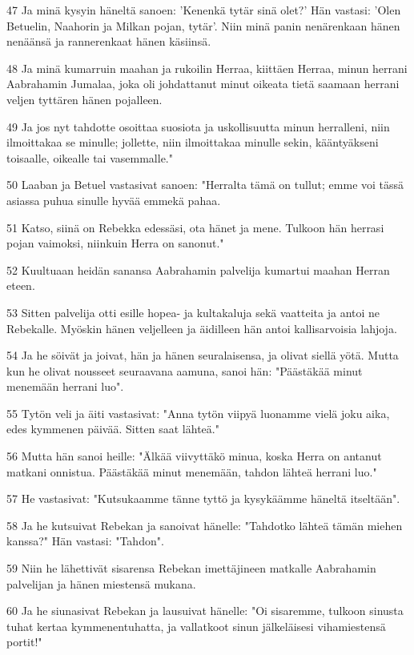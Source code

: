 \par 47 Ja minä kysyin häneltä sanoen: 'Kenenkä tytär sinä olet?' Hän vastasi: 'Olen Betuelin, Naahorin ja Milkan pojan, tytär'. Niin minä panin nenärenkaan hänen nenäänsä ja rannerenkaat hänen käsiinsä.
\par 48 Ja minä kumarruin maahan ja rukoilin Herraa, kiittäen Herraa, minun herrani Aabrahamin Jumalaa, joka oli johdattanut minut oikeata tietä saamaan herrani veljen tyttären hänen pojalleen.
\par 49 Ja jos nyt tahdotte osoittaa suosiota ja uskollisuutta minun herralleni, niin ilmoittakaa se minulle; jollette, niin ilmoittakaa minulle sekin, kääntyäkseni toisaalle, oikealle tai vasemmalle."
\par 50 Laaban ja Betuel vastasivat sanoen: "Herralta tämä on tullut; emme voi tässä asiassa puhua sinulle hyvää emmekä pahaa.
\par 51 Katso, siinä on Rebekka edessäsi, ota hänet ja mene. Tulkoon hän herrasi pojan vaimoksi, niinkuin Herra on sanonut."
\par 52 Kuultuaan heidän sanansa Aabrahamin palvelija kumartui maahan Herran eteen.
\par 53 Sitten palvelija otti esille hopea- ja kultakaluja sekä vaatteita ja antoi ne Rebekalle. Myöskin hänen veljelleen ja äidilleen hän antoi kallisarvoisia lahjoja.
\par 54 Ja he söivät ja joivat, hän ja hänen seuralaisensa, ja olivat siellä yötä. Mutta kun he olivat nousseet seuraavana aamuna, sanoi hän: "Päästäkää minut menemään herrani luo".
\par 55 Tytön veli ja äiti vastasivat: "Anna tytön viipyä luonamme vielä joku aika, edes kymmenen päivää. Sitten saat lähteä."
\par 56 Mutta hän sanoi heille: "Älkää viivyttäkö minua, koska Herra on antanut matkani onnistua. Päästäkää minut menemään, tahdon lähteä herrani luo."
\par 57 He vastasivat: "Kutsukaamme tänne tyttö ja kysykäämme häneltä itseltään".
\par 58 Ja he kutsuivat Rebekan ja sanoivat hänelle: "Tahdotko lähteä tämän miehen kanssa?" Hän vastasi: "Tahdon".
\par 59 Niin he lähettivät sisarensa Rebekan imettäjineen matkalle Aabrahamin palvelijan ja hänen miestensä mukana.
\par 60 Ja he siunasivat Rebekan ja lausuivat hänelle: "Oi sisaremme, tulkoon sinusta tuhat kertaa kymmenentuhatta, ja vallatkoot sinun jälkeläisesi vihamiestensä portit!"
